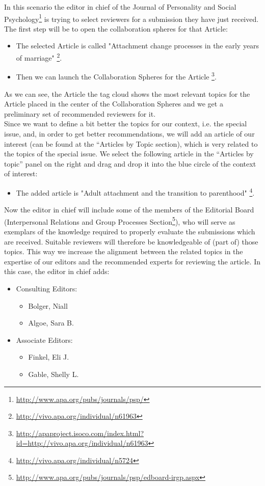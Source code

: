 In this scenario the editor in chief of the Journal of Personality and Social Psychology\footnote{\url{http://www.apa.org/pubs/journals/psp/}} is trying to select reviewers for a submission they have just received. The first step will be to open the collaboration spheres for that Article: 
\begin{itemize}
  \item The selected Article is called "Attachment change processes in the early years of marriage" \footnote{\url{http://vivo.apa.org/individual/n61963}}.
  \item Then we can launch the Collaboration Spheres for the Article \footnote{\url{http://apaproject.isoco.com/index.html?id=http://vivo.apa.org/individual/n61963}}.
\end{itemize}
As we can see, the Article the tag cloud shows the most relevant topics for the Article placed in the center of the Collaboration Spheres and we get a preliminary set of recommended reviewers for it.\\
Since we want to define a bit better the topics for our context, i.e. the special issue, and, in order to get better recommendations, we will add an article of our interest (can be found at the “Articles by Topic section), which is very related to the topics of the special issue. We select the following article in the “Articles by topic” panel on the right and drag and drop it into the blue circle of the context of interest:
\begin{itemize}
  \item The added article is "Adult attachment and the transition to parenthood" \footnote{\url{http://vivo.apa.org/individual/n5724}}.
\end{itemize}
Now the editor in chief will include some of the members of the Editorial Board (Interpersonal Relations and Group Processes Section\footnote{\url{http://www.apa.org/pubs/journals/psp/edboard-irgp.aspx}}), who will serve as exemplars of the knowledge required to properly evaluate the submissions which are received. Suitable reviewers will therefore be knowledgeable of (part of) those topics. This way we increase the alignment between the related topics in the expertise of our editors and the recommended experts for reviewing the article. In this case, the editor in chief adds:
\begin{itemize}
  \item Consulting Editors:
  \begin{itemize}
    \item Bolger, Niall
    \item Algoe, Sara B.
  \end{itemize}
  \item Associate Editors:
  \begin{itemize}
      \item Finkel, Eli J.
      \item Gable, Shelly L.
  \end{itemize}
\end{itemize}
